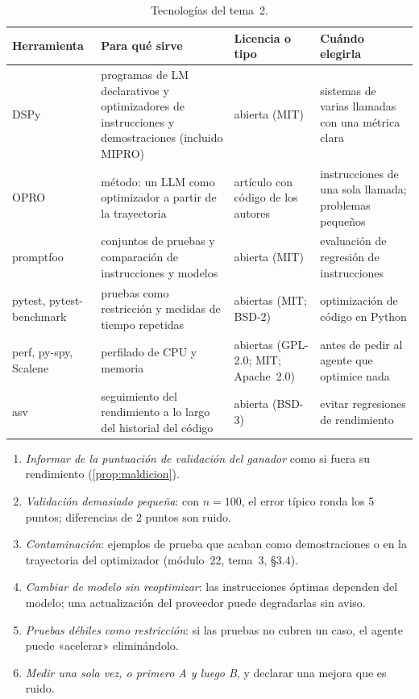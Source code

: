 \begin{table}[h]
\centering\small
\caption{Tecnologías del tema~2.}\label{tab:tec2}
\begin{tabularx}{\textwidth}{@{}>{\raggedright\arraybackslash}p{2.5cm}>{\raggedright\arraybackslash}X>{\raggedright\arraybackslash}p{2.1cm}>{\raggedright\arraybackslash}X@{}}
\toprule
Herramienta & Para qué sirve & Licencia o tipo & Cuándo elegirla \\
\midrule
DSPy~\cite{dspy} & programas de LM declarativos y optimizadores de instrucciones y demostraciones (incluido MIPRO) & abierta (MIT) & sistemas de varias llamadas con una métrica clara \\
OPRO~\cite{opro} & método: un LLM como optimizador a partir de la trayectoria & artículo con código de los autores & instrucciones de una sola llamada; problemas pequeños \\
promptfoo & conjuntos de pruebas y comparación de instrucciones y modelos & abierta (MIT) & evaluación de regresión de instrucciones \\
pytest, pytest-benchmark & pruebas como restricción y medidas de tiempo repetidas & abiertas (MIT; BSD-2) & optimización de código en Python \\
perf, py-spy, Scalene & perfilado de CPU y memoria & abiertas (GPL-2.0; MIT; Apache~2.0) & antes de pedir al agente que optimice nada \\
asv & seguimiento del rendimiento a lo largo del historial del código & abierta (BSD-3) & evitar regresiones de rendimiento \\
\bottomrule
\end{tabularx}
\end{table}

\begin{observacion}\label{obs:errores2}
\begin{enumerate}[label=(\alph*)]
  \item \emph{Informar de la puntuación de validación del ganador} como si fuera su rendimiento (\cref{prop:maldicion}).
  \item \emph{Validación demasiado pequeña}: con $n=100$, el error típico ronda los 5 puntos; diferencias de 2 puntos son ruido.
  \item \emph{Contaminación}: ejemplos de prueba que acaban como demostraciones o en la trayectoria del optimizador (módulo~22, tema~3, §3.4).
  \item \emph{Cambiar de modelo sin reoptimizar}: las instrucciones óptimas dependen del modelo; una actualización del proveedor puede degradarlas sin aviso.
  \item \emph{Pruebas débiles como restricción}: si las pruebas no cubren un caso, el agente puede «acelerar» eliminándolo.
  \item \emph{Medir una sola vez, o primero A y luego B}, y declarar una mejora que es ruido.
\end{enumerate}
\end{observacion}

